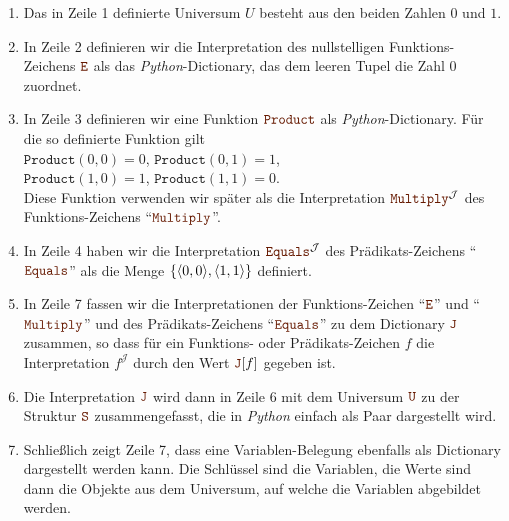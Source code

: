 \begin{enumerate}
\item Das in Zeile 1 definierte Universum $U$ besteht aus den beiden Zahlen $0$ und $1$.
      
\item In Zeile 2 definieren wir die Interpretation des nullstelligen Funktions-Zeichens $\mytt{E}$
      als das \textsl{Python}-Dictionary, das dem leeren Tupel die Zahl $0$ zuordnet.
\item In Zeile 3 definieren wir eine Funktion $\mytt{Product}$ als \textsl{Python}-Dictionary.  Für
      die so definierte Funktion gilt
      \\[0.2cm]
      \hspace*{1.3cm}
      $\mathtt{Product}(0,0) = 0$, \quad
      $\mathtt{Product}(0,1) = 1$, 
      \\[0.2cm]
      \hspace*{1.3cm}
      $\mathtt{Product}(1,0) = 1$, \quad
      $\mathtt{Product}(1,1) = 0$.
      \\[0.2cm]  
      Diese Funktion verwenden wir später als die Interpretation $\mytt{Multiply}^\mathcal{J}$ des Funktions-Zeichens ``$\mytt{Multiply}$''.
\item In Zeile 4 haben wir  die Interpretation $\mytt{Equals}^\mathcal{J}$ des
      Prädikats-Zeichens ``$\mytt{Equals}$'' als die Menge $\{ \pair(0,0), \pair(1,1)\}$ definiert.
\item In Zeile 7 fassen wir die Interpretationen der Funktions-Zeichen ``$\mytt{E}$'' und
      ``$\mytt{Multiply}$'' und des Prädikats-Zeichens ``$\mytt{Equals}$'' zu dem Dictionary $\mytt{J}$
      zusammen, so dass für ein Funktions- oder Prädikats-Zeichen $f$ die Interpretation $f^\mathcal{J}$ durch
      den Wert $\mytt{J}[f]$ gegeben ist. 
\item Die Interpretation $\mytt{J}$ wird dann in Zeile 6 mit dem
      Universum $\mytt{U}$ zu der Struktur $\mytt{S}$ zusammengefasst, die in \textsl{Python} einfach als
      Paar dargestellt wird.
\item Schließlich zeigt Zeile 7, dass eine
      Variablen-Belegung ebenfalls als Dictionary dargestellt werden kann.  Die Schlüssel
      sind die Variablen, die Werte sind dann die Objekte aus dem Universum, auf welche die Variablen
      abgebildet werden.
\end{enumerate}


